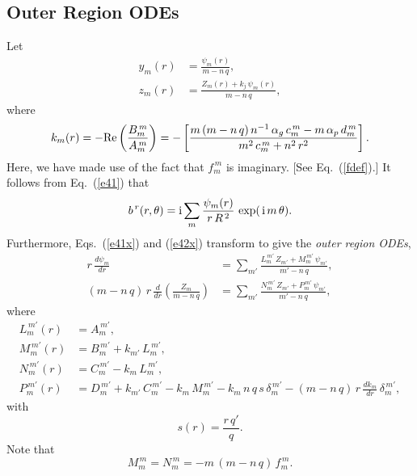 \documentclass[12pt,prb,aps]{revtex4-1}
\begin{document}
\subsection{Outer Region ODEs}\label{ode2}
Let 
\begin{align}
y_m(r) &= \frac{\psi_m(r)}{m-n\,q},\label{e115}\\[0.5ex]
z_m(r) &= \frac{Z_m(r)+k_j\,\psi_m(r)}{m-n\,q},\label{Zdef}
\end{align}
where
\begin{equation}\label{e117}
k_m(r) = -{\rm Re}\left(\frac{B_m^{\,m}}{A_m^{\,m}}\right) = -\left[\frac{m\,(m-n\,q)\,
n^{-1}\,\alpha_g\,c_m^{\,m} - m\,\alpha_p\,d_m^{\,m}}{m^2\,c_m^{\,m}+n^2\,r^2}\right].
\end{equation}
Here, we have made use of the fact that $f_m^{\,m}$ is imaginary. [See Eq.~(\ref{fdef}).] 
It follows from Eq.~(\ref{e41}) that
\begin{equation}\label{psidef}
b^{\,r}(r,\theta)= {\rm i}\sum_{m}\frac{\psi_m(r)}{r\,R^{\,2}}\,\exp(\,{\rm i}\,m\,\theta). 
\end{equation}
Furthermore, Eqs.~(\ref{e41x}) and (\ref{e42x}) transform to give the  {\em outer region ODEs},\cite{am1,am3}
\begin{align}\label{e61x}
r\,\frac{d\psi_m}{dr} &=\sum_{m'}\frac{L_m^{\,m'}\,Z_{m'}+M_m^{\,m'}\,\psi_{m'}}{m'-n\,q},\\[0.5ex]
(m-n\,q)\,r\,\frac{d}{dr}\!\left(\frac{Z_m}{m-n\,q}\right)&=\sum_{m'}\frac{N_m^{\,m'}\,Z_{m'}+P_m^{\,m'}\,\psi_{m'}}{m'-n\,q},\label{e62x}
\end{align}
where
\begin{align}\label{e121}
L_m^{\,m'}(r) &=A_m^{\,m'},\\[0.5ex]
M_m^{\,m'}(r)& = B_m^{\,m'}+k_{m'}\,L_m^{\,m'},\\[0.5ex]
N_m^{\,m'}(r)&= C_m^{\,m'}-k_m\,L_m^{\,m'},\\[0.5ex]
P_m^{\,m'}(r) &=D_m^{\,m'}+k_{m'}\,C_m^{\,m'}  -k_m\,M_m^{\,m'}-k_m\,n\,q\,s\,\delta_m^{\,m'} - (m-n\,q)\,r\,\frac{dk_{m}}{dr}\,\delta_m^{\,m'},\label{e124}
\end{align}
with 
\begin{equation}
s(r)=\frac{r\,q'}{q}.
\end{equation}
Note that
\begin{equation}
M_m^{\,m}=N_m^{\,m} = - m\,(m-n\,q)\,f_m^{\,m}.
\end{equation}
\end{document}
